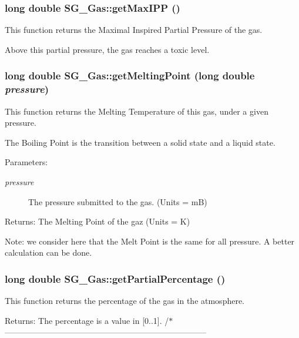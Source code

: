 \subsubsection{\setlength{\rightskip}{0pt plus 5cm}long double SG\_\-Gas::get\-Max\-IPP ()}\label{class_s_g___gas_a17}


This function returns the Maximal Inspired Partial Pressure of the gas. 

Above this partial pressure, the gas reaches a toxic level. 
\subsubsection{\setlength{\rightskip}{0pt plus 5cm}long double SG\_\-Gas::get\-Melting\-Point (long double {\em pressure})}\label{class_s_g___gas_a4}


This function returns the Melting Temperature of this gas, under a given pressure. 

The Boiling Point is the transition between a solid state and a liquid state. \begin{Desc}
\item[Parameters:]
\begin{description}
\item[{\em pressure}]The pressure submitted to the gas. (Units = m\-B) \end{description}
\end{Desc}
\begin{Desc}
\item[Returns:]The Melting Point of the gaz (Units = K)\end{Desc}


Note: we consider here that the Melt Point is the same for all pressure. A better calculation can be done. 
\subsubsection{\setlength{\rightskip}{0pt plus 5cm}long double SG\_\-Gas::get\-Partial\-Percentage ()}\label{class_s_g___gas_a22}


This function returns the percentage of the gas in the atmosphere. 

\begin{Desc}
\item[Returns:]The percentage is a value in [0..1]. /$\ast$-------------------------------------------------------------------------- \end{Desc}
